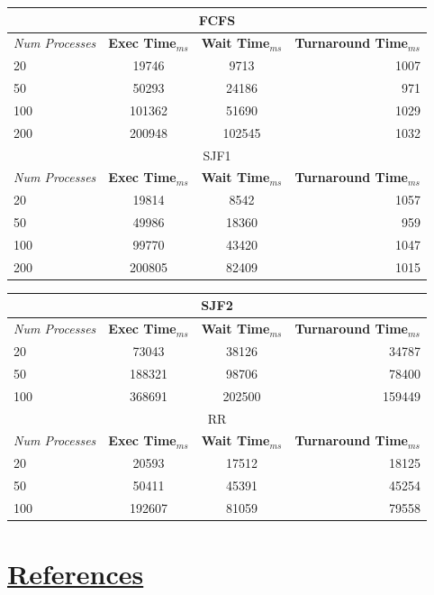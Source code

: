 \documentclass{article}
\begin{document}
\begin{center}
  \begin{tabular}{l|c|c|r}
    \multicolumn{4}{c}{FCFS} \\
    \toprule
    \textit{Num Processes} & \textbf{Exec Time}$_{ms}$ & \textbf{Wait Time}$_{ms}$ & \textbf{Turnaround Time}$_{ms}$ \\
    \midrule
    20 & 19746 & 9713 & 1007 \\ \hline
    50 & 50293 & 24186 & 971 \\ \hline
    100 & 101362 & 51690 & 1029 \\ \hline
    200 & 200948 & 102545 & 1032 \\
    \bottomrule
    \toprule
    \multicolumn{4}{c}{SJF1} \\
    \toprule
    \textit{Num Processes} & \textbf{Exec Time}$_{ms}$ & \textbf{Wait Time}$_{ms}$ & \textbf{Turnaround Time}$_{ms}$ \\
    \midrule
    20 & 19814 & 8542 & 1057 \\ \hline
    50 & 49986 & 18360 & 959 \\ \hline
    100 & 99770 & 43420 & 1047 \\ \hline
    200 & 200805 & 82409 & 1015 \\
    \bottomrule
    \toprule
  \end{tabular}
\end{center}
\newpage
\begin{center}
  \begin{tabular}{l|c|c|r}
    \multicolumn{4}{c}{SJF2} \\
    \toprule
    \textit{Num Processes} & \textbf{Exec Time}$_{ms}$ & \textbf{Wait Time}$_{ms}$ & \textbf{Turnaround Time}$_{ms}$ \\
    \midrule
    20 & 73043 & 38126 & 34787 \\ \hline
    50 & 188321 & 98706 & 78400 \\ \hline
    100 & 368691 & 202500 & 159449 \\
    \bottomrule
    \toprule
    \multicolumn{4}{c}{RR} \\
    \toprule
    \textit{Num Processes} & \textbf{Exec Time}$_{ms}$ & \textbf{Wait Time}$_{ms}$ & \textbf{Turnaround Time}$_{ms}$ \\
    \midrule
    20 & 20593 & 17512 & 18125 \\ \hline
    50 & 50411 & 45391 & 45254 \\ \hline
    100 & 192607 & 81059 & 79558 \\
    \bottomrule
    \toprule
  \end{tabular}
\end{center}

\section{\underline{References}}
\end{document}
